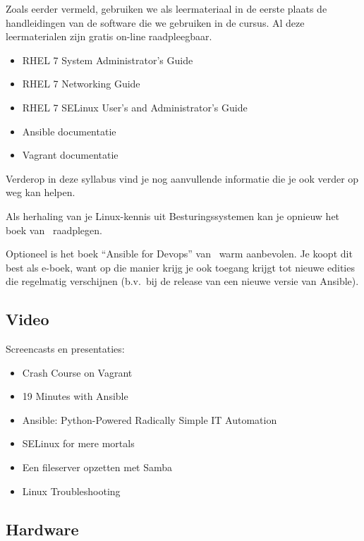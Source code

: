 Zoals eerder vermeld, gebruiken we als leermateriaal in de eerste plaats de handleidingen van de software die we gebruiken in de cursus. Al deze leermaterialen zijn gratis on-line raadpleegbaar.

\begin{itemize}
  \item RHEL 7 System Administrator's Guide~\autocite{SvistunovEtAl2016}
  \item RHEL 7 Networking Guide~\autocite{JahodaEtAl2016}
  \item RHEL 7 SELinux User's and Administrator's Guide~\autocite{JahodaEtAl2016a}
  \item Ansible documentatie~\autocite{Ansible2016}
  \item Vagrant documentatie~\autocite{Hashicorp}
\end{itemize}

Verderop in deze syllabus vind je nog aanvullende informatie die je ook verder op weg kan helpen.

Als herhaling van je Linux-kennis uit Besturingssystemen kan je opnieuw het boek van~\textcite{Cobbaut2015} raadplegen.

Optioneel is het boek ``Ansible for Devops'' van~\textcite{Geerling2016} warm aanbevolen. Je koopt dit best als e-boek, want op die manier krijg je ook toegang krijgt tot nieuwe edities die regelmatig verschijnen (b.v.~bij de release van een nieuwe versie van Ansible).

\subsection{Video}
\label{ssec:video}

Screencasts en presentaties:

\begin{itemize}
  \item Crash Course on Vagrant~\autocite{Weissig2014}
  \item 19 Minutes with Ansible~\autocite{Weissig2015}
  \item Ansible: Python-Powered Radically Simple IT Automation~\autocite{DeHaan2014}
  \item SELinux for mere mortals~\autocite{Cameron2012}
  \item Een fileserver opzetten met Samba~\autocite{VanVreckem2014}
  \item Linux Troubleshooting~\autocite{VanVreckem2015b}
\end{itemize}

\subsection{Hardware}
\label{ssec:hardware}

